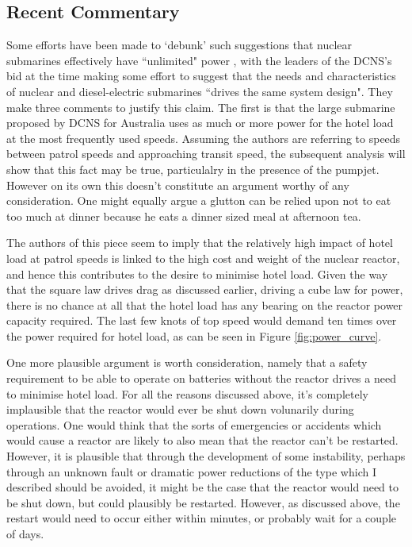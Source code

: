 \documentclass{article}\usepackage[]{graphicx}\usepackage[]{color}
\begin{document}
\subsection{Recent Commentary}
Some efforts have been made to `debunk' such suggestions that nuclear submarines effectively have ``unlimited" power \parencite{autret2016}, with the leaders of the DCNS's bid at the time making some effort to suggest that the needs and characteristics of nuclear and diesel-electric submarines ``drives the same system design". They make three comments to justify this claim.  The first is that the large submarine proposed by DCNS for Australia uses as much or more power for the hotel load at the most frequently used speeds.  Assuming the authors are referring to speeds between patrol speeds and approaching transit speed, the subsequent analysis will show that this fact may be true, particulalry in the presence of the pumpjet. However on its own this doesn't constitute an argument worthy of any consideration. One might equally argue a glutton can be relied upon not to eat too much at dinner because he eats a dinner sized meal at afternoon tea.

The authors of this piece seem to imply that the relatively high impact of hotel load at patrol speeds is linked to the high cost and weight of the nuclear reactor, and hence this contributes to the desire to minimise hotel load.  Given the way that the square law drives drag as discussed earlier, driving a cube law for power, there is no chance at all that the hotel load has any bearing on the reactor power capacity required.  The last few knots of top speed would demand ten times over the power required for hotel load, as can be seen in Figure \ref{fig:power_curve}.

One more plausible argument is worth consideration, namely that a safety requirement to be able to operate on batteries without the reactor drives a need to minimise hotel load. For all the reasons discussed above, it's completely implausible that the reactor would ever be shut down volunarily during operations.  One would think that the sorts of emergencies or accidents which would cause a reactor are likely to also mean that the reactor can't be restarted.  However, it is plausible that through the development of some instability, perhaps through an unknown fault or dramatic power reductions of the type which I described should be avoided, it might be the case that the reactor would need to be shut down, but could plausibly be restarted.  However, as discussed above, the restart would need to occur either within minutes, or probably wait for a couple of days.
\end{document}
